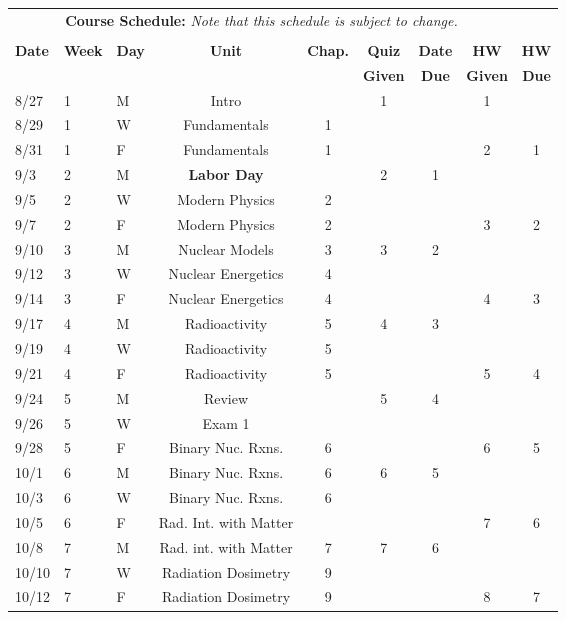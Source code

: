 \documentclass[11pt, a4paper]{article}
\begin{document}
\pagebreak
\FloatBarrier
\renewcommand{\arraystretch}{1}
\begin{table}[h]
\begin{center}
\begin{tabular}{lllcccccc}
\multicolumn{8}{c}{\textbf{Course Schedule:}\textit{ Note that this schedule is 
subject to change.}}\\
&&&&&&&&\\
\textbf{Date} & \textbf{Week} & \textbf{Day} & \textbf{Unit} & \textbf{Chap.} & \textbf{Quiz}& \textbf{Date} & \textbf{HW} & \textbf{HW}\\
              &  &  &  &  & \textbf{Given} & \textbf{Due} & \textbf{Given} & \textbf{Due}\\ \hline
\hline
8/27 & 1 & M  & Intro &  & 1 &  & 1 & \\
8/29 & 1 & W & Fundamentals & 1 &  &  &  &  \\
8/31 & 1 & F & Fundamentals & 1 &  &  & 2 & 1 \\
9/3 & 2 & M & \textbf{Labor Day}  &  & 2 & 1 &  &  \\
9/5 & 2 & W & Modern Physics  & 2 &  &  &  &  \\
9/7 & 2 & F & Modern Physics & 2 &  &  & 3 & 2 \\
9/10 & 3 & M & Nuclear Models  & 3 & 3 & 2 &  &  \\
9/12 & 3 & W & Nuclear Energetics  & 4 &  &  &  &  \\
9/14 & 3 & F & Nuclear Energetics  & 4 &  &  & 4 & 3 \\
9/17 & 4 & M & Radioactivity  & 5 & 4 & 3 &  &  \\
9/19 & 4 & W & Radioactivity  & 5 &  &  &  &  \\
9/21 & 4 & F & Radioactivity  & 5 &  &  & 5 & 4 \\
9/24 & 5 & M & Review  &  & 5 & 4 &  &  \\
9/26 & 5 & W & Exam 1  &  &  &  &  &  \\
9/28 & 5 & F & Binary Nuc. Rxns.  & 6 &  &  & 6 & 5 \\
10/1 & 6 & M & Binary Nuc. Rxns.  & 6 & 6 & 5 &  &  \\
10/3 & 6 & W & Binary Nuc. Rxns.  & 6 &  &  &  &  \\
10/5 & 6 & F & Rad. Int. with Matter  &  &  &  & 7 & 6 \\
10/8 & 7 & M & Rad. int. with Matter & 7 & 7 & 6 &  &  \\
10/10 & 7 & W & Radiation Dosimetry  & 9 &  &  &  &  \\
10/12 & 7 & F & Radiation Dosimetry  & 9 &  &  & 8 & 7 \\

\end{tabular}
\end{center}
\end{table}
\end{document}
